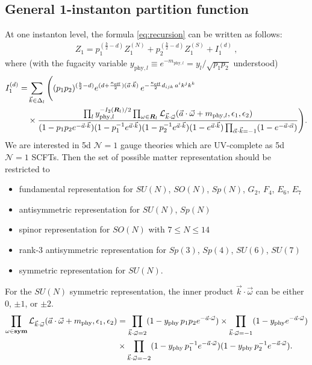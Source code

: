 \documentclass[letterpaper, 11pt]{article}
\newcommand{\nn}{\nonumber}
\def\CL{{\cal L}}
\def\a{\alpha}
\def\e{\epsilon}
\def\k{\kappa}
\def\w{\omega}
\begin{document}
 \subsection{General 1-instanton partition function}
 \label{subsec:oneinst}
At one instanton level, the formula \eqref{eq:recursion} can be written as follows:
\begin{align}
  \label{eq:1inst}
  Z_1 = p_1^{(\frac{b}{2}-d)}Z^{(N)}_{1}  + p_2^{(\frac{b}{2}-d)}  Z^{(S)}_1  + I_1^{(d)} \ , 
 \end{align}
 where  (with the fugacity variable $y_{\text{phy},l} \equiv e^{-m_{\text{phy},l}} = y_l / \sqrt{p_1p_2}$ understood)
 \begin{align}
  \label{eq:1inst-i}
  I_1^{(d)} = &\sum_{\vec{k} \in \Delta_l}  \Bigg( 
     (p_1p_2)^{(\frac{b}{2}-d ) } e^{(d+\frac{\k_\text{eff}}{2})(\vec{a}\cdot\vec{k})}\,
    e^{-\frac{\k_\text{eff}}{2}d_{ijk}\,a^ik^jk^k}  \\& 
  \times \frac{\prod_{l} y_{\text{phy},l}^{-I_2(\boldsymbol{R}_l)/2} \prod_{\w \in \boldsymbol{R}_l} \CL_{\vec{k}\cdot\vec{\w}}(\vec{a}\cdot \vec{\w} + m_{\text{phy},l}, \e_1,\e_2)}{ (1-p_1p_2 e^{-\vec{a} \cdot \vec{k} })(1-p_1^{-1} e^{\vec{a} \cdot \vec{k} })(1-p_2^{-1} e^{\vec{a} \cdot \vec{k} })(1-e^{\vec{a} \cdot \vec{k} })\prod_{\vec{\a} \cdot \vec{k} = -1}(1-e^{-\vec{a}\cdot\vec{\alpha}})}
    \Bigg). \nn
\end{align}
We are interested in 5d $\mathcal{N}=1$ gauge theories which are UV-complete as 5d $\mathcal{N}=1$ SCFTs. Then the set of possible matter representation should be restricted to \cite{Jefferson:2017ahm}
\begin{itemize}\setlength\itemsep{-0.3em}
  \item fundamental representation for $SU(N)$, $SO(N)$, $Sp(N)$, $G_2$, $F_4$, $E_6$, $E_7$
  \item antisymmetric representation for $SU(N)$, $Sp(N)$
  \item spinor representation for $SO(N)$ with $7 \leq N \leq 14$
  \item rank-3 antisymmetric representation for $Sp(3)$, $Sp(4)$, $SU(6)$, $SU(7)$
  \item symmetric representation for $SU(N)$.
\end{itemize}
For the $SU(N)$ symmetric representation, the inner product $ \vec{k}\cdot \vec{\w}$ can be either $0$, $\pm 1$, or $\pm 2$.
\begin{align}
  \label{eq:weight-expansion-sym}
  \prod_{\w \in \boldsymbol{\textbf{sym}}} \CL_{\vec{k}\cdot\vec{\w}}(\vec{a}\cdot \vec{\w} + m_{\text{phy}}, \e_1,\e_2)  &= \prod_{\vec{k}\cdot \vec{\w} = 2} (1-y_\text{phy}\,  p_1p_2 e^{-\vec{a}\cdot \vec{\w}}) \times \prod_{\vec{k}\cdot \vec{\w} = -1}(1-y_\text{phy} e^{-\vec{a}\cdot \vec{\w}}) \nn\\&\times \prod_{\vec{k}\cdot \vec{\w} = -2} (1-y_\text{phy}\,  p_1^{-1} e^{-\vec{a}\cdot \vec{\w}})(1-y_\text{phy}\,  p_2^{-1} e^{-\vec{a}\cdot \vec{\w}}).
 \end{align}
\end{document}
